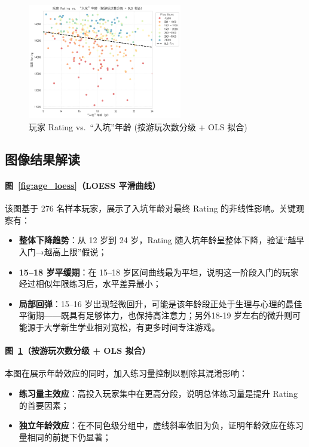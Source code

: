 \documentclass[12pt]{article}
\begin{document}
\begin{figure}[htbp]
	\centering
	\includegraphics[width=0.6\textwidth]{fig3.png}
	\caption{玩家 Rating vs.\ “入坑”年龄 (按游玩次数分级 + OLS 拟合)}
	\label{fig:age_playcount}
\end{figure}

\subsection{图像结果解读}

\paragraph{图~\ref{fig:age_loess}（LOESS 平滑曲线）}  
该图基于 276 名样本玩家，展示了入坑年龄对最终 Rating 的非线性影响。关键观察有：  
\begin{itemize}
	\item \textbf{整体下降趋势}：从 12 岁到 24 岁，Rating 随入坑年龄呈整体下降，验证“越早入门→越高上限”假说；  
	\item \textbf{15–18 岁平缓期}：在 15–18 岁区间曲线最为平坦，说明这一阶段入门的玩家经过相似年限练习后，水平差异最小；  
	\item \textbf{局部回弹}：15–16 岁出现轻微回升，可能是该年龄段正处于生理与心理的最佳平衡期——既具有足够体力，也保持高注意力；另外18-19 岁左右的微升则可能源于大学新生学业相对宽松，有更多时间专注游戏。  
\end{itemize}

\paragraph{图~\ref{fig:age_playcount}（按游玩次数分级 + OLS 拟合）}  
本图在展示年龄效应的同时，加入练习量控制以剔除其混淆影响：  
\begin{itemize}
	\item \textbf{练习量主效应}：高投入玩家集中在更高分段，说明总体练习量是提升 Rating 的首要因素；  
	\item \textbf{独立年龄效应}：在不同色级分组中，虚线斜率依旧为负，证明年龄效应在练习量相同的前提下仍显著；  
\end{itemize}
\end{document}
